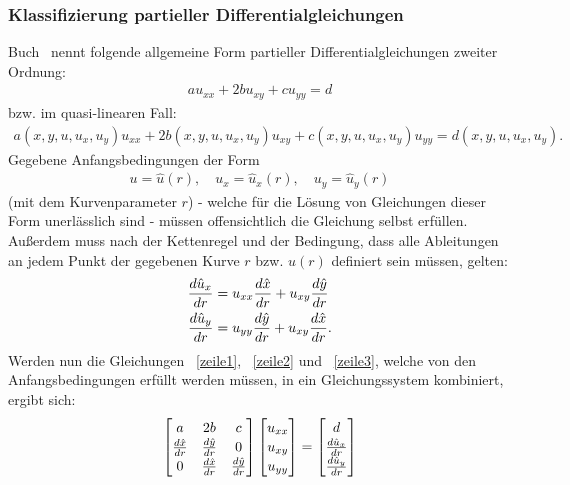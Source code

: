 \subsubsection{Klassifizierung partieller Differentialgleichungen}

Buch~\cite[S. 115]{epstein_partial_2017} nennt folgende allgemeine Form partieller Differentialgleichungen zweiter Ordnung:
\begin{align}
\label{zeile1}
    a u_{xx} + 2b u_{xy} + c u_{yy} = d
\end{align}
bzw. im quasi-linearen Fall:
\begin{align*}
    a(x,y,u,u_x,u_y) u_{xx} + 2b(x,y,u,u_x,u_y) u_{xy} + c(x,y,u,u_x,u_y) u_{yy} = d(x,y,u,u_x,u_y).
\end{align*}
Gegebene Anfangsbedingungen der Form 
\begin{align*}
    u=\hat{u}(r), \quad u_x = \hat{u}_x (r), \quad u_y = \hat{u}_y (r)
\end{align*}
(mit dem Kurvenparameter $r$) - welche für die Lösung von Gleichungen dieser Form unerlässlich sind - müssen offensichtlich die Gleichung selbst erfüllen. Außerdem muss nach der Kettenregel und der Bedingung, dass alle Ableitungen an jedem Punkt der gegebenen Kurve $r$ bzw. $\hat{u}(r)$ definiert sein müssen, gelten:
\begin{align}
\label{zeile2}
    \frac{d \hat{u}_x}{d r} &= u_{xx} \frac{d \hat{x}}{d r} + u_{xy} \frac{d \hat{y}}{d r} \\ 
\label{zeile3}
    \frac{d \hat{u}_y}{d r} &= u_{yy} \frac{d \hat{y}}{d r} + u_{xy} \frac{d \hat{x}}{d r}.
\end{align}
Werden nun die Gleichungen ~\eqref{zeile1}, ~\eqref{zeile2} und ~\eqref{zeile3}, welche von den Anfangsbedingungen erfüllt werden müssen, in ein Gleichungssystem kombiniert, ergibt sich:
\begin{align}
\label{lgs_qual}
    \renewcommand{\arraystretch}{1.15}
    \begin{bmatrix}
        a & 2b & c \\
        \diff{\hat{x}}{r} & \diff{\hat{y}}{r} & 0 \\
        0 &  \diff{\hat{x}}{r} & \diff{\hat{y}}{r} \\
    \end{bmatrix}
    \begin{bmatrix}
        u_{xx} \\
        u_{xy} \\
        u_{yy} \\
    \end{bmatrix}
    =
    \begin{bmatrix}
        d \\
        \diff{\hat{u}_x}{r} \\
        \diff{\hat{u}_y}{r}
    \end{bmatrix}
\end{align}
